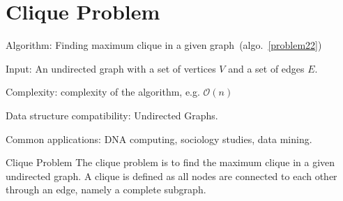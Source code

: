 \documentclass{article}
\begin{document}
\fi

%
%

\def\pbname{Clique Problem} %

\section{\pbname} 

\begin{overview}
\item [Algorithm:] Finding maximum clique in a given graph~(algo.~\ref{problem22}) 
\item [Input:] An undirected graph with a set of vertices $V$ and a set of edges $E$.
\item [Complexity:] complexity of the algorithm, e.g. $\mathcal{O}(n)$
\item [Data structure compatibility:] Undirected Graphs.
\item [Common applications:] DNA computing, sociology studies, data mining.%
\end{overview}



\begin{problem}{\pbname}
	The clique problem is to find the maximum clique in a given undirected graph. A clique is defined as all nodes are connected to each other through an edge, namely a complete subgraph.
\end{problem} 
\end{document}
